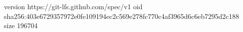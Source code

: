 version https://git-lfs.github.com/spec/v1
oid sha256:403e6729357972e0fe109194ec2c569e278fc770c4af3965d6c6eb7295d2c188
size 196704
